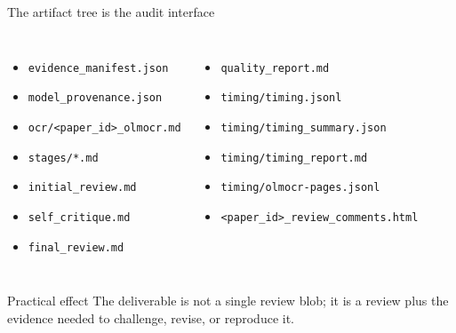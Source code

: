 \documentclass[aspectratio=169,professionalfonts]{beamer}
\newcommand{\artifact}[1]{\texttt{\footnotesize #1}}
\begin{document}
\begin{frame}{The artifact tree is the audit interface}
  \begin{columns}[T,onlytextwidth]
      \begin{itemize}
        \item \artifact{evidence\_manifest.json}
        \item \artifact{model\_provenance.json}
        \item \artifact{ocr/<paper\_id>\_olmocr.md}
        \item \artifact{stages/*.md}
        \item \artifact{initial\_review.md}
        \item \artifact{self\_critique.md}
        \item \artifact{final\_review.md}
      \end{itemize}
      \begin{itemize}
        \item \artifact{quality\_report.md}
        \item \artifact{timing/timing.jsonl}
        \item \artifact{timing/timing\_summary.json}
        \item \artifact{timing/timing\_report.md}
        \item \artifact{timing/olmocr-pages.jsonl}
        \item \artifact{<paper\_id>\_review\_comments.html}
      \end{itemize}
  \end{columns}

  \vspace{0.4em}
  \begin{block}{Practical effect}
    The deliverable is not a single review blob; it is a review plus the
    evidence needed to challenge, revise, or reproduce it.
  \end{block}

\end{frame}
\end{document}
